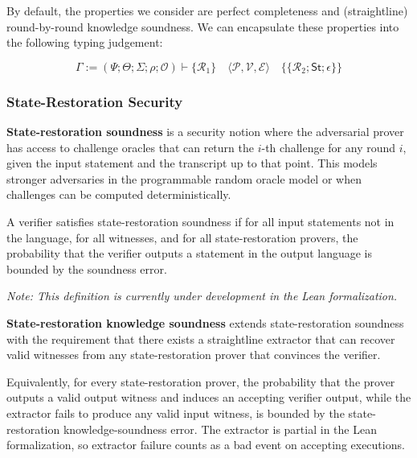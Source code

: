By default, the properties we consider are perfect completeness and (straightline) round-by-round knowledge soundness. We can encapsulate these properties into the following typing judgement:

\[
    \Gamma := (\Psi; \Theta; \varSigma; \rho; \mathcal{O}) \vdash \{\mathcal{R}_1\} \quad \langle\mathcal{P}, \mathcal{V}, \mathcal{E}\rangle \quad \{\!\!\{\mathcal{R}_2; \mathsf{St}; \epsilon\}\!\!\}
\]

\subsubsection{State-Restoration Security}

\begin{definition}
    \label{def:sr_soundness}
    \textbf{State-restoration soundness} is a security notion where the adversarial prover has access to
    challenge oracles that can return the $i$-th challenge for any round $i$, given the input statement
    and the transcript up to that point. This models stronger adversaries in the programmable random
    oracle model or when challenges can be computed deterministically.

    A verifier satisfies state-restoration soundness if for all input statements not in the language,
    for all witnesses, and for all state-restoration provers, the probability that the verifier
    outputs a statement in the output language is bounded by the soundness error.

    \emph{Note: This definition is currently under development in the Lean formalization.}
\end{definition}

\begin{definition}
    \label{def:sr_knowledge_soundness}
    \textbf{State-restoration knowledge soundness} extends state-restoration soundness with the
    requirement that there exists a straightline extractor that can recover valid witnesses from
    any state-restoration prover that convinces the verifier.

    Equivalently, for every state-restoration prover, the probability that the prover outputs a
    valid output witness and induces an accepting verifier output, while the extractor fails to
    produce any valid input witness, is bounded by the state-restoration knowledge-soundness error.
    The extractor is partial in the Lean formalization, so extractor failure counts as a bad event
    on accepting executions.

\end{definition}


